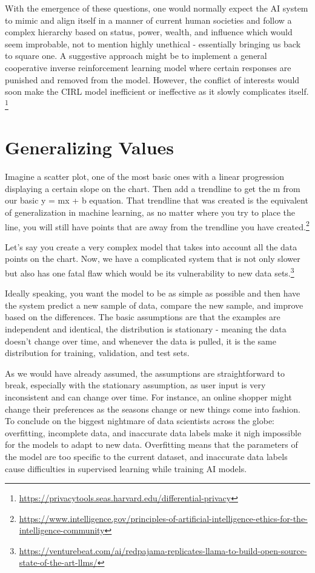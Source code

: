 \documentclass[
]{book}
\begin{document}
With the emergence of these questions, one would normally expect the AI system to mimic and align itself in a manner of current human societies and follow a complex hierarchy based on status, power, wealth, and influence which would seem improbable, not to mention highly unethical - essentially bringing us back to square one. A suggestive approach might be to implement a general cooperative inverse reinforcement learning model where certain responses are punished and removed from the model. However, the conflict of interests would soon make the CIRL model inefficient or ineffective as it slowly complicates itself. \footnote{\url{https://privacytools.seas.harvard.edu/differential-privacy}}

\hypertarget{generalizing-values}{%
\section{Generalizing Values}\label{generalizing-values}}

Imagine a scatter plot, one of the most basic ones with a linear progression displaying a certain slope on the chart. Then add a trendline to get the m from our basic y = mx + b equation. That trendline that was created is the equivalent of generalization in machine learning, as no matter where you try to place the line, you will still have points that are away from the trendline you have created.\footnote{\url{https://www.intelligence.gov/principles-of-artificial-intelligence-ethics-for-the-intelligence-community}}

Let's say you create a very complex model that takes into account all the data points on the chart. Now, we have a complicated system that is not only slower but also has one fatal flaw which would be its vulnerability to new data sets.\footnote{\url{https://venturebeat.com/ai/redpajama-replicates-llama-to-build-open-source-state-of-the-art-llms/}}

Ideally speaking, you want the model to be as simple as possible and then have the system predict a new sample of data, compare the new sample, and improve based on the differences. The basic assumptions are that the examples are independent and identical, the distribution is stationary - meaning the data doesn't change over time, and whenever the data is pulled, it is the same distribution for training, validation, and test sets.

As we would have already assumed, the assumptions are straightforward to break, especially with the stationary assumption, as user input is very inconsistent and can change over time. For instance, an online shopper might change their preferences as the seasons change or new things come into fashion.
To conclude on the biggest nightmare of data scientists across the globe: overfitting, incomplete data, and inaccurate data labels make it nigh impossible for the models to adapt to new data. Overfitting means that the parameters of the model are too specific to the current dataset, and inaccurate data labels cause difficulties in supervised learning while training AI models.
\end{document}
